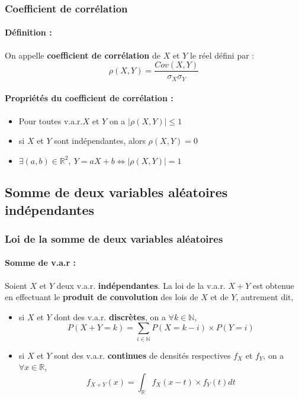 \documentclass[10pt,a4paper,twoside]{article}
\begin{document}
\subsubsection{Coefficient de corrélation}

\paragraph{Définition :} On appelle \textbf{coefficient de corrélation} de $X$ et $Y$ le réel défini par :
$$\rho(X,Y)=\frac{Cov(X,Y)}{\sigma_{X}\sigma_{Y}}$$
\paragraph{Propriétés du coefficient de corrélation :} 
\begin{itemize}
\item Pour toutes v.a.r.$X$ et $Y$ on a $|\rho(X,Y)|\leqslant 1$
\item si $X$ et $Y$ sont indépendantes, alors $\rho(X,Y)=0$
\item $\exists (a,b)\in \mathbb{R}^{2},\ Y=aX+b \Leftrightarrow |\rho(X,Y)|=1$ 
\end{itemize}

\subsection{Somme de deux variables aléatoires indépendantes}
\subsubsection{Loi de la somme de deux variables aléatoires}

\paragraph{Somme de v.a.r :} Soient $X$ et $Y$ deux v.a.r. \textbf{indépendantes}. La loi de la v.a.r. $X+Y$ est obtenue en effectuant le \textbf{produit de convolution} des lois de $X$ et de $Y$, autrement dit,
\begin{itemize}
\item si $X$ et $Y$ dont des v.a.r. \textbf{discrètes}, on a $\forall k \in \mathbb{N}$,
$$P(X+Y=k)=\sum_{i\in\mathbb{N}}P(X=k-i)\times P(Y=i)$$
\item si $X$ et $Y$ sont des v.a.r. \textbf{continues} de densités respectives $f_{X}$ et $f_{Y}$, on a $\forall x \in \mathbb{R}$,
$$f_{X+Y}(x)=\int_{\mathbb{R}}f_{X}(x-t)\times f_{Y}(t) dt$$
\end{itemize}
\end{document}
